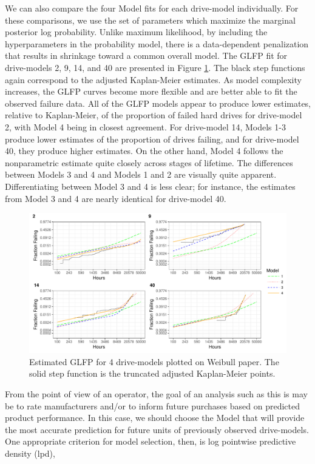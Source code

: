 \documentclass[12pt]{article}
\begin{document}
We can also compare the four Model fits for each drive-model individually.  For these comparisons, we use the set of parameters which maximize the marginal posterior log probability. Unlike maximum likelihood, by including the hyperparameters in the probability model, there is a data-dependent penalization that results in shrinkage toward a common overall model. The GLFP fit for drive-models 2, 9, 14, and 40 are presented in Figure \ref{fig:mod_comp_leg}.  The black step functions again correspond to the adjusted Kaplan-Meier estimates.  As model complexity increases, the GLFP curves become more flexible and are better able to fit the observed failure data.  All of the GLFP models appear to produce lower estimates, relative to Kaplan-Meier, of the proportion of failed hard drives for drive-model 2, with Model 4 being in closest agreement.  For drive-model 14, Models 1-3 produce lower estimates of the proportion of drives failing, and for drive-model 40, they produce higher estimates.  On the other hand, Model 4 follows the nonparametric estimate quite closely across stages of lifetime.  The differences between Models 3 and 4 and Models 1 and 2 are visually quite apparent.  Differentiating between Model 3 and 4 is less clear; for instance, the estimates from Model 3 and 4 are nearly identical for drive-model 40.
\begin{figure}[H]
    \centering
   \includegraphics[width=\textwidth]{mod_compare_legend}
		\caption{Estimated GLFP for 4 drive-models plotted on Weibull paper.  The solid step function is the truncated adjusted Kaplan-Meier points.  \label{fig:mod_comp_leg}} 
\end{figure}


From the point of view of an operator, the goal of an analysis such as this is may be to rate manufacturers and/or to inform future purchases based on predicted product performance. In this case, we should choose the Model that will provide the most accurate prediction for future units of previously observed drive-models. One appropriate criterion for model selection, then, is log pointwise predictive density (lpd),
\end{document}

